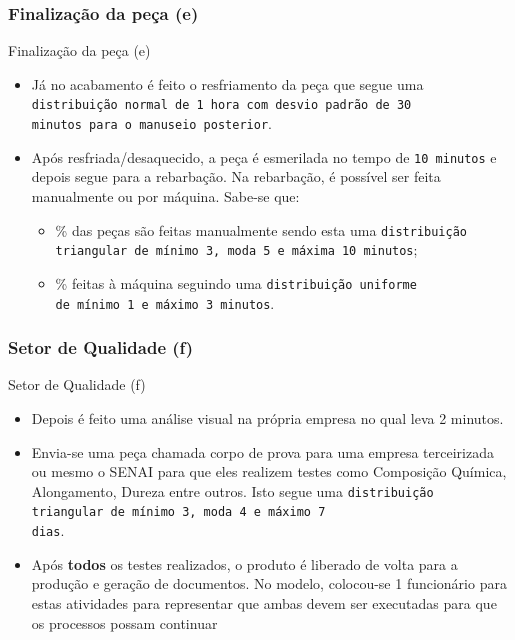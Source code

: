 \documentclass[xcolor=dvipsnames]{beamer}
\let\olditem=\item%
\renewcommand{\item}{\olditem \justifying}%
\begin{document}
		
\subsubsection{Finalização da peça (e)}
\begin{frame}{Finalização da peça (e)}
	\begin{itemize}
		\item Já no acabamento é feito o resfriamento da peça que segue uma \texttt{distribuição normal de 1 hora com desvio padrão de 30\\ minutos para o manuseio posterior}.
		      				
		      \bigskip
		      				
		\item Após resfriada/desaquecido, a peça é esmerilada no tempo de \texttt{10 minutos} e depois segue para a rebarbação. Na rebarbação, é possível ser feita manualmente ou por máquina. Sabe-se que:
		      \begin{itemize}
		      	\item 60\% das peças são feitas manualmente sendo esta uma \texttt{distribuição triangular de mínimo 3, moda 5 e máxima 10 minutos}; 
		      	      					
		      	      \bigskip
		      	      					
		      	      					
		      	\item 40\% feitas à máquina seguindo uma \texttt{distribuição uniforme \\de mínimo 1 e máximo 3 minutos}.
		      \end{itemize}
	\end{itemize}
\end{frame}
		
\subsubsection{Setor de Qualidade (f)}
\begin{frame}{Setor de Qualidade (f)}
	\begin{itemize}
		\item Depois é feito uma análise visual na própria empresa no qual leva 2 minutos.
		      				
		      \bigskip
		      				
		\item Envia-se uma peça chamada corpo de prova para uma empresa terceirizada ou mesmo o SENAI para que eles realizem testes como Composição Química, Alongamento, Dureza entre outros. Isto segue uma \texttt{distribuição triangular de mínimo 3, moda 4 e máximo 7 \\dias}.
		      				
		      \bigskip
		      				
		\item Após \textbf{todos} os testes realizados, o produto é liberado de volta para a produção e geração de documentos. {\color{red}No modelo, colocou-se 1 funcionário para estas atividades para representar que ambas devem ser executadas para que os processos possam continuar}
	\end{itemize}
\end{frame}
		
\end{document}
